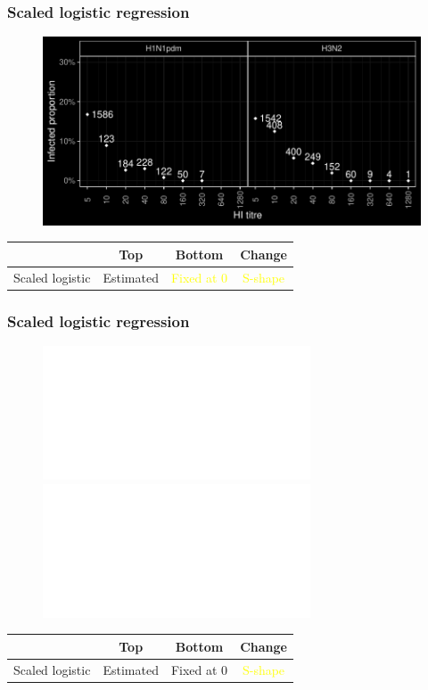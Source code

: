 \documentclass{beamer}
\begin{document}
\begin{frame}
\frametitle{Scaled logistic regression}

	\begin{figure}
		\includegraphics[scale = 0.6]{../data-plot/hanam_counts_general_dark.pdf}%
	\end{figure}

	\begin{table}
	\begin{tabular}{l | ccc}
		 & Top & Bottom & Change \\
		\hline
		Scaled logistic & Estimated & \textcolor{yellow}{Fixed at 0} & \textcolor{yellow}{S-shape}
	\end{tabular}
	\end{table}

\end{frame}

\begin{frame}
\frametitle{Scaled logistic regression}

	\begin{figure}
		\includegraphics<1>[scale = 0.6]{../data-plot/hanam_counts_general_dark.pdf}%
		\includegraphics<2>[scale = 0.6]{../fit-sclr/infection-boot_dark.pdf}%
	\end{figure}

	\begin{table}
	\begin{tabular}{l | ccc}
		 & Top & Bottom & Change \\
		\hline
		Scaled logistic & Estimated & Fixed at 0 & \textcolor{yellow}{S-shape}
	\end{tabular}
	\end{table}

\end{frame}
\end{document}
